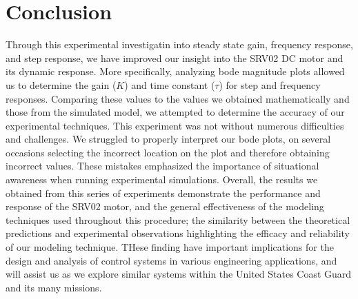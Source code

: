 \documentclass[conference,compsoc]{IEEEtran}
\begin{document}
\section{Conclusion}
Through this experimental investigatin into steady state gain, frequency response, and step response, we have improved our insight into the SRV02 DC motor and its dynamic response. More specifically, analyzing bode magnitude plots allowed us to determine the gain ($K$) and time constant ($\tau$) for step and frequency responses. Comparing these values to the values we obtained mathematically and those from the simulated model, we attempted to determine the accuracy of our experimental techniques.
This experiment was not without numerous difficulties and challenges. We struggled to properly interpret our bode plots, on several occasions selecting the incorrect location on the plot and therefore obtaining incorrect values. These mistakes emphasized the importance of situational awareness when running experimental simulations.
Overall, the results we obtained from this series of experiments demonstrate the performance and response of the SRV02 motor, and the general effectiveness of the modeling techniques used throughout this procedure; the similarity between the theoretical predictions and experimental observations highlighting the efficacy and reliability of our modeling technique. THese finding have important implications for the design and analysis of control systems in various engineering applications, and will assist us as we explore similar systems within the United States Coast Guard and its many missions. 

%
%
\end{document}
